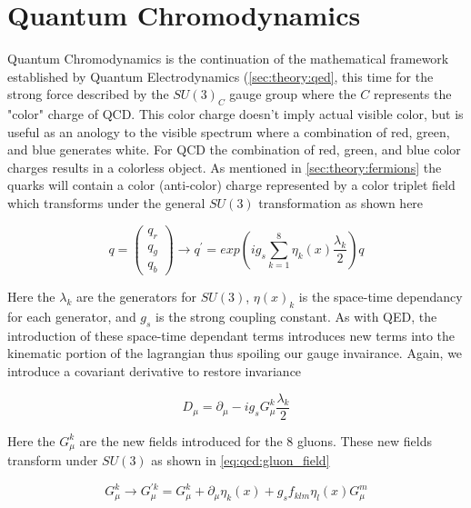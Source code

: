 \section{Quantum Chromodynamics} \label{sec:theory:qcd}

Quantum Chromodynamics is the continuation of the mathematical framework
established by Quantum Electrodynamics (\cref{sec:theory:qed}, this time
for the strong force described by the $SU(3)_C$ gauge group where the $C$
represents the "color" charge of QCD.  This color charge doesn't imply actual
visible color, but is useful as an anology to the visible spectrum where a
combination of red, green, and blue generates white.  For QCD the combination of
red, green, and blue color charges results in a colorless object.  As mentioned
in \cref{sec:theory:fermions} the quarks will contain a color
(anti-color) charge represented by a color triplet field which transforms under
the general $SU(3)$ transformation as shown here

\begin{equation}
q = \left( \begin{matrix} q_{r} \\ q_{g} \\ q_{b} \end{matrix} \right)
\rightarrow q^{'} = exp \left( ig_{s} \sum_{k=1}^{8} \eta_{k}(x)
\frac{\lambda_k}{2} \right) q
\end{equation}

Here the $\lambda_{k}$ are the generators for $SU(3)$, $\eta(x)_{k}$ is the
space-time dependancy for each generator, and  $g_s$ is the strong coupling constant.
As with QED, the introduction of these space-time dependant terms introduces new
terms into the kinematic portion of the lagrangian thus spoiling our gauge
invairance.  Again, we introduce a covariant derivative to restore invariance

\begin{equation}
D_{\mu} = \partial_{\mu} - ig_{s}G_{\mu}^{k}\frac{\lambda_{k}}{2}
\end{equation}

Here the $G_{\mu}^{k}$ are the new fields introduced for the 8 gluons.  These
new fields transform under $SU(3)$ as shown in
\cref{eq:qcd:gluon_field}

\begin{equation} \label{eq:qcd:gluon_field}
G_{\mu}^{k} \rightarrow G_{\mu}^{'k} = G_{\mu}^{k} + \partial_{\mu}\eta_{k}(x) +
g_{s}f_{klm}\eta_{l}(x)G_{\mu}^{m}
\end{equation}

